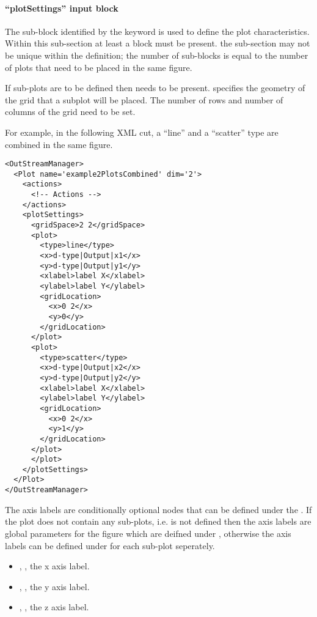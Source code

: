 \paragraph{``plotSettings'' input block \label{sec:plotSettings}}

The sub-block identified by the keyword  is used to
define the plot characteristics.
%
Within this sub-section at least a  block must be present.
%
the  sub-section may not be unique within the
 definition; the number of  sub-blocks is
equal to the number of plots that need to be placed in the same figure.
%

If sub-plots are to be defined then  needs to be present.
 specifies the geometry of the grid that a subplot will be placed.
The number of rows and number of columns of the grid need to be set.
%

For example, in the following XML cut, a ``line'' and a ``scatter'' type are
combined in the same figure.
%
\begin{lstlisting}[style=XML,morekeywords={dim,name},deletekeywords={type}]
<OutStreamManager>
  <Plot name='example2PlotsCombined' dim='2'>
    <actions>
      <!-- Actions -->
    </actions>
    <plotSettings>
      <gridSpace>2 2</gridSpace>
      <plot>
        <type>line</type>
        <x>d-type|Output|x1</x>
        <y>d-type|Output|y1</y>
        <xlabel>label X</xlabel>
        <ylabel>label Y</ylabel>
        <gridLocation>
          <x>0 2</x>
          <y>0</y>
        </gridLocation>
      </plot>
      <plot>
        <type>scatter</type>
        <x>d-type|Output|x2</x>
        <y>d-type|Output|y2</y>
        <xlabel>label X</xlabel>
        <ylabel>label Y</ylabel>
        <gridLocation>
          <x>0 2</x>
          <y>1</y>
        </gridLocation>
      </plot>
      </plot>
    </plotSettings>
  </Plot>
</OutStreamManager>
\end{lstlisting}

The axis labels  are conditionally optional nodes
that can be defined under the . If the plot does not contain any sub-plots,
i.e.  is not defined then the axis labels are global parameters for the figure
which are deifned under , otherwise the axis labels can be defined under 
for each sub-plot seperately.
\begin{itemize}
  \item {}, , the x axis
  label.
  \item {}, , the y axis
  label.
  \item {}, ,
  the z axis label.
\end{itemize}
%

